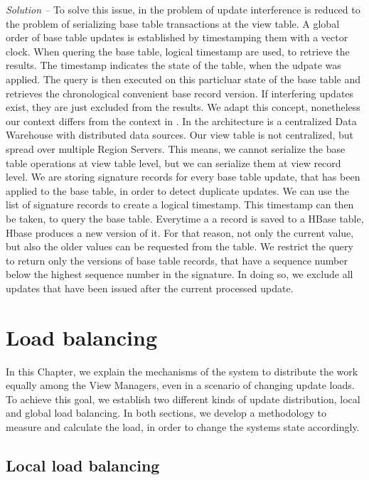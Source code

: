 \documentclass[11pt,a4paper,bibtotoc,idxtotoc,headsepline,footsepline,footexclude,BCOR12mm,DIV13]{scrbook}
\begin{document}
\noindent  
\emph{Solution -- }To solve this issue, in \cite{chen:multiversion} the problem of update interference is reduced to the problem of serializing base table transactions at the view table. A global order of base table updates is established by timestamping them with a vector clock. When quering the base table, logical timestamp are used, to retrieve the results. The timestamp indicates the state of the table, when the udpate was applied. The query is then executed on this particluar state of the base table and retrieves the chronological convenient base record version.  If interfering updates exist, they are just excluded from the results. We adapt this concept, nonetheless our context differs from the context in \cite{chen:multiversion}. In \cite{chen:multiversion} the architecture is a centralized Data Warehouse with distributed data sources. Our view table is not centralized, but spread over multiple Region Servers. This means, we cannot serialize the base table operations at view table level, but we can serialize them at view record level. We are storing signature records for every base table update, that has been applied to the base table, in order to detect duplicate updates. We can use the list of signature records to create a logical timestamp. This timestamp can then be taken, to query the base table. Everytime a a record is saved to a HBase table, Hbase produces a new version of it. For that reason, not only the current value, but also the older values can be requested from the table. We restrict the query to return only the versions of base table records, that have a sequence number below the highest sequence number in the signature. In doing so, we exclude all updates that have been issued after the current processed update.

\chapter{Load balancing}
\label{chap:loadbalancing}

In this Chapter, we explain the mechanisms of the system to distribute the work equally among the View Managers, even in a scenario of changing update loads. To achieve this goal, we establish two different kinds of update distribution, local and global load balancing. In both sections, we develop a methodology to measure and calculate the load, in order to change the systems state accordingly.\\  


\section{Local load balancing}
\end{document}
